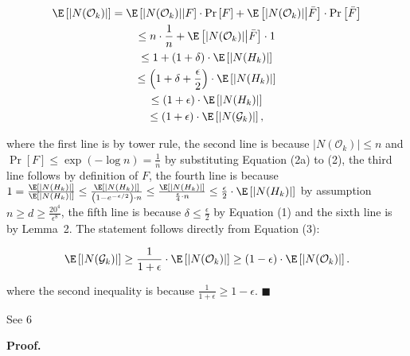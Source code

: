 \[\begin{gathered}
\displaystyle\E\left[|N(\mathcal{O}_{k})|\right] \displaystyle=\E\left[|N(\mathcal{O}_{k})|\middle|F\right]\cdot\Pr\left[F\right]+\E\left[|N(\mathcal{O}_{k})|\middle|\bar{F}\right]\cdot\Pr\left[\bar{F}\right] \\
\displaystyle\leq n\cdot\frac{1}{n}+\E\left[|N(\mathcal{O}_{k})|\middle|\bar{F}\right]\cdot 1 \\
\displaystyle\leq 1+(1+\delta)\cdot\E\left[|N(H_{k})|\right] \\
\displaystyle\leq\left(1+\delta+\frac{\epsilon}{2}\right)\cdot\E\left[|N(H_{k})|\right] \\
\displaystyle\leq\left(1+\epsilon\right)\cdot\E\left[|N(H_{k})|\right] \\
\displaystyle\leq\left(1+\epsilon\right)\cdot\E\left[|N(\mathcal{G}_{k})|\right],
\end{gathered}\]


where the first line is by tower rule, the second line is because $|N(\mathcal{O}_{k})|\leq n$ and $\Pr\left[F\right]\leq\exp\left(-\log{n}\right)=\frac{1}{n}$ by substituting Equation (2a) to (2), the third line follows by definition of $F$, the fourth line is because $1=\frac{\E\left[|N(H_{k})|\right]}{\E\left[|N(H_{k})|\right]}\leq\frac{\E\left[|N(H_{k})|\right]}{\left(1-e^{-\epsilon/2}\right)\cdot n}\leq\frac{\E\left[|N(H_{k})|\right]}{\frac{\epsilon}{4}\cdot n}\leq\frac{\epsilon}{2}\cdot\E\left[|N(H_{k})|\right]$ by assumption $n\geq d\geq\frac{20^{4}}{\epsilon^{8}}$, the fifth line is because $\delta\leq\frac{\epsilon}{2}$ by Equation (1) and the sixth line is by Lemma 2.
The statement follows directly from Equation (3):\par


\[\begin{gathered}
\displaystyle\E\left[|N(\mathcal{G}_{k})|\right]\geq\frac{1}{1+\epsilon}\cdot\E\left[|N(\mathcal{O}_{k})|\right]\geq\left(1-\epsilon\right)\cdot\E\left[|N(\mathcal{O}_{k})|\right].
\end{gathered}\]


where the second inequality is because $\frac{1}{1+\epsilon}\geq 1-\epsilon$.
\ensuremath{\blacksquare}\par





See 6\par




\par\medskip\noindent\textbf{Proof.}\par



